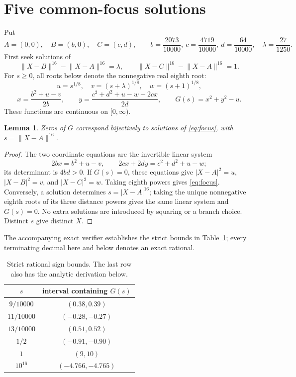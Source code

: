 \documentclass[11pt]{article}
\newtheorem{lemma}{Lemma}
\newcommand{\N}[2]{\lVert #1-#2\rVert^{16}}
\begin{document}
\section{Five common-focus solutions}
Put
\begin{equation}\label{eq:data}
 A=(0,0),\quad B=(b,0),\quad C=(c,d),\qquad
 b=\frac{2073}{10000},\ c=\frac{4719}{10000},\ d=\frac{64}{10000},\quad
 \lambda=\frac{27}{1250}.
\end{equation}
First seek solutions of
\begin{equation}\label{eq:focus}
 \N{X}{B}-\N{X}{A}=\lambda,\qquad
 \N{X}{C}-\N{X}{A}=1.
\end{equation}
For $s\geq0$, all roots below denote the nonnegative real eighth root:
\[
 u=s^{1/8},\quad v=(s+\lambda)^{1/8},\quad w=(s+1)^{1/8},
\]
\begin{equation}\label{eq:G}
 x=\frac{b^2+u-v}{2b},\qquad
 y=\frac{c^2+d^2+u-w-2cx}{2d},\qquad G(s)=x^2+y^2-u.
\end{equation}
These functions are continuous on $[0,\infty)$.

\begin{lemma}\label{lem:equiv}
Zeros of $G$ correspond bijectively to solutions of \eqref{eq:focus}, with $s=\N{X}{A}$.
\end{lemma}
\begin{proof}
The two coordinate equations are the invertible linear system
\[
 2bx=b^2+u-v,\qquad 2cx+2dy=c^2+d^2+u-w;
\]
its determinant is $4bd>0$. If $G(s)=0$, these equations give
$|X-A|^2=u$, $|X-B|^2=v$, and $|X-C|^2=w$. Taking eighth powers gives \eqref{eq:focus}. Conversely, a solution determines $s=|X-A|^{16}$; taking the unique nonnegative eighth roots of its three distance powers gives the same linear system and $G(s)=0$. No extra solutions are introduced by squaring or a branch choice. Distinct $s$ give distinct $X$.
\end{proof}

The accompanying exact verifier establishes the strict bounds in Table~\ref{tab:signs}; every terminating decimal here and below denotes an exact rational.

\begin{table}[ht]
\centering
\begin{tabular}{c@{\qquad}c}
\toprule
$s$ & interval containing $G(s)$\\
\midrule
$9/10000$ & $(0.38,0.39)$\\
$11/10000$ & $(-0.28,-0.27)$\\
$13/10000$ & $(0.51,0.52)$\\
$1/2$ & $(-0.91,-0.90)$\\
$1$ & $(9,10)$\\
$10^{16}$ & $(-4.766,-4.765)$\\
\bottomrule
\end{tabular}
\caption{Strict rational sign bounds. The last row also has the analytic derivation below.}\label{tab:signs}
\end{table}
\end{document}
